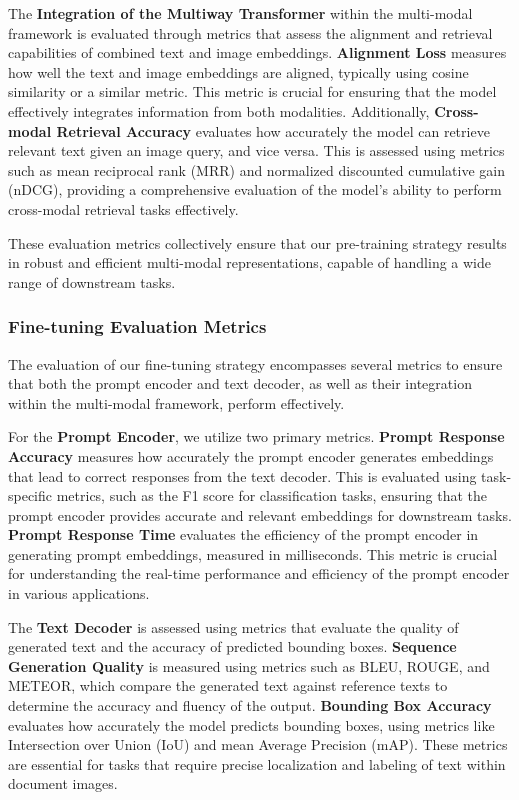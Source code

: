 \documentclass{article}
\begin{document}
The \textbf{Integration of the Multiway Transformer} within the multi-modal framework is evaluated through metrics that assess the alignment and retrieval capabilities of combined text and image embeddings. \textbf{Alignment Loss} measures how well the text and image embeddings are aligned, typically using cosine similarity or a similar metric. This metric is crucial for ensuring that the model effectively integrates information from both modalities. Additionally, \textbf{Cross-modal Retrieval Accuracy} evaluates how accurately the model can retrieve relevant text given an image query, and vice versa. This is assessed using metrics such as mean reciprocal rank (MRR) and normalized discounted cumulative gain (nDCG), providing a comprehensive evaluation of the model's ability to perform cross-modal retrieval tasks effectively.

These evaluation metrics collectively ensure that our pre-training strategy results in robust and efficient multi-modal representations, capable of handling a wide range of downstream tasks.

\subsubsection{Fine-tuning Evaluation Metrics}

The evaluation of our fine-tuning strategy encompasses several metrics to ensure that both the prompt encoder and text decoder, as well as their integration within the multi-modal framework, perform effectively.

For the \textbf{Prompt Encoder}, we utilize two primary metrics. \textbf{Prompt Response Accuracy} measures how accurately the prompt encoder generates embeddings that lead to correct responses from the text decoder. This is evaluated using task-specific metrics, such as the F1 score for classification tasks, ensuring that the prompt encoder provides accurate and relevant embeddings for downstream tasks. \textbf{Prompt Response Time} evaluates the efficiency of the prompt encoder in generating prompt embeddings, measured in milliseconds. This metric is crucial for understanding the real-time performance and efficiency of the prompt encoder in various applications.

The \textbf{Text Decoder} is assessed using metrics that evaluate the quality of generated text and the accuracy of predicted bounding boxes. \textbf{Sequence Generation Quality} is measured using metrics such as BLEU, ROUGE, and METEOR, which compare the generated text against reference texts to determine the accuracy and fluency of the output. \textbf{Bounding Box Accuracy} evaluates how accurately the model predicts bounding boxes, using metrics like Intersection over Union (IoU) and mean Average Precision (mAP). These metrics are essential for tasks that require precise localization and labeling of text within document images.
\end{document}

